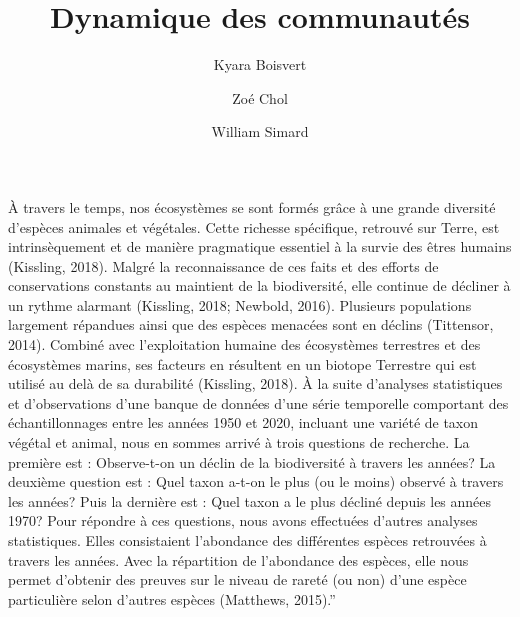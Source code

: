 \documentclass[9pt,twocolumn,twoside,]{pnas-new}
\title{Dynamique des communautés}
\author[Université de Sherbrooke, Département d'écologie, 2500 Boulevard
de l'Université, Sherbrooke, Québec, J1N 3C6]{Kyara Boisvert}
\author[Université de Sherbrooke, Département d'écologie, 2500 Boulevard
de l'Université, Sherbrooke, Québec, J1N 3C6]{Zoé Chol}
\author[Université de Sherbrooke, Département d'écologie, 2500 Boulevard
de l'Université, Sherbrooke, Québec, J1N 3C6]{William Simard}
\begin{document}
\verticaladjustment{-2pt}



\maketitle
\thispagestyle{firststyle}


\acknow{}

À travers le temps, nos écosystèmes se sont formés grâce à une grande
diversité d'espèces animales et végétales. Cette richesse spécifique,
retrouvé sur Terre, est intrinsèquement et de manière pragmatique
essentiel à la survie des êtres humains (Kissling, 2018). Malgré la
reconnaissance de ces faits et des efforts de conservations constants au
maintient de la biodiversité, elle continue de décliner à un rythme
alarmant (Kissling, 2018; Newbold, 2016). Plusieurs populations
largement répandues ainsi que des espèces menacées sont en déclins
(Tittensor, 2014). Combiné avec l'exploitation humaine des écosystèmes
terrestres et des écosystèmes marins, ses facteurs en résultent en un
biotope Terrestre qui est utilisé au delà de sa durabilité (Kissling,
2018). À la suite d'analyses statistiques et d'observations d'une banque
de données d'une série temporelle comportant des échantillonnages entre
les années 1950 et 2020, incluant une variété de taxon végétal et
animal, nous en sommes arrivé à trois questions de recherche. La
première est : Observe-t-on un déclin de la biodiversité à travers les
années? La deuxième question est : Quel taxon a-t-on le plus (ou le
moins) observé à travers les années? Puis la dernière est : Quel taxon a
le plus décliné depuis les années 1970? Pour répondre à ces questions,
nous avons effectuées d'autres analyses statistiques. Elles consistaient
l'abondance des différentes espèces retrouvées à travers les années.
Avec la répartition de l'abondance des espèces, elle nous permet
d'obtenir des preuves sur le niveau de rareté (ou non) d'une espèce
particulière selon d'autres espèces (Matthews, 2015).''
\end{document}
